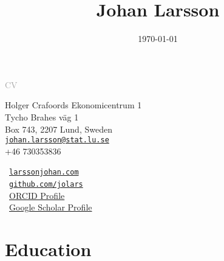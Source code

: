 \documentclass[
  10pt,
  headsepline=true,
  english,
  DIV=12
]{scrartcl}
\date{\today}
\title{Johan Larsson}
\renewcommand*{%
  \mkbibnamegiven
}[1]{\ifitemannotation{highlight}{\textbf{#1}}{#1}}
\renewcommand*{%
  \mkbibnamefamily
}[1]{\ifitemannotation{highlight}{\textbf{#1}}{#1}}
\begin{document}
\begin{titlepage}
\end{titlepage}

\begin{center}
  {\large \textcolor{darkgray}{CV}}
  \medskip

  \smallskip

  \noindent {\large \today}
\end{center}

\baselineskip

\begin{minipage}[t]{.5\textwidth}
  \small\noindent%
  Holger Crafoords Ekonomicentrum 1\\
  Tycho Brahes väg 1\\
  Box 743, 2207 Lund, Sweden
  \vspace{1ex}\\
  \href{mailto:johan.larsson@stat.lu.se}{\nolinkurl{johan.larsson@stat.lu.se}}\\
  +46 730353836
\end{minipage}%
\begin{minipage}[t]{0.5\textwidth}
  \raggedleft\small%
  {\faHome}\, \href{https://larssonjohan.com}{\nolinkurl{larssonjohan.com}}\\
  {\faGithub}\, \href{https://github.com/jolars}{\nolinkurl{github.com/jolars}} \\
  {\aiOrcid}\,
  \href{https://orcid.org/0000-0002-4029-5945}{ORCID Profile}\\
  {\aiGoogleScholar}\,
  \href{https://scholar.google.com/citations?user=DCJvywYAAAAJ}{Google Scholar Profile}\\
\end{minipage}


\section{Education}

\end{document}
